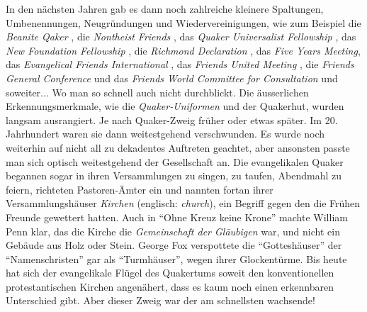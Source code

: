 In den nächsten Jahren gab es dann noch zahlreiche kleinere Spaltungen,
Umbenennungen, Neugründungen und Wiedervereinigungen, wie zum Beispiel die
\textit{Beanite Qaker} , die \textit{Nontheist
Friends} , das \textit{Quaker Universalist
Fellowship} , das \textit{New
Foundation Fellowship} , die
\textit{Richmond Declaration} , das \textit{Five
Years Meeting}, das \textit{Evangelical Friends International}
, das \textit{Friends United
Meeting} , die \textit{Friends General
Conference}  und das \textit{Friends
World Committee for Consultation} und soweiter... Wo man so schnell auch nicht
durchblickt.
Die äusserlichen Erkennungsmerkmale, wie die \textit{Quaker-Uniformen}
 und der Quakerhut, wurden
langsam ausrangiert. Je nach Quaker-Zweig früher oder etwas später. Im 20.
Jahrhundert waren sie dann weitestgehend verschwunden. Es wurde noch weiterhin
auf
nicht all zu dekadentes Auftreten geachtet, aber ansonsten passte man sich
optisch weitestgehend der Gesellschaft an. Die evangelikalen Quaker begannen
sogar in ihren Versammlungen zu singen, zu taufen, Abendmahl zu feiern,
richteten Pastoren-Ämter ein und nannten
fortan ihrer Versammlungshäuser \textit{Kirchen} 
(englisch: \textit{church}),
ein Begriff gegen den die Frühen Freunde gewettert hatten. Auch in "`Ohne Kreuz
keine Krone"' machte William Penn klar, das die Kirche die \textit{Gemeinschaft
der
Gläubigen} war, und nicht ein Gebäude aus Holz oder Stein. George Fox
verspottete
die "`Gotteshäuser"' der "`Namenschristen"' gar als
"`Turmhäuser"', wegen ihrer
Glockentürme. Bis heute hat sich der evangelikale Flügel des Quakertums soweit
den konventionellen protestantischen Kirchen angenähert, dass es kaum noch
einen
erkennbaren Unterschied gibt. Aber dieser Zweig war der am schnellsten
wachsende!

\medskip

